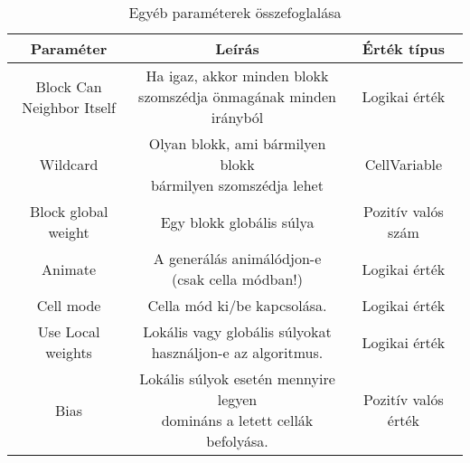 \begin{table}[htbp]
\caption{Egyéb paraméterek összefoglalása}
\begin{center}
\begin{tabular}{ |c|c|c| } 
\hline
Paraméter & Leírás & Érték típus \\
 \hline\hline
  \makecell{Block Can \\ Neighbor Itself} & \makecell{Ha igaz, akkor minden blokk 
 \\szomszédja önmagának minden irányból} & Logikai érték \\
 \hline
 Wildcard &\makecell{ Olyan blokk, ami bármilyen blokk \\ bármilyen szomszédja lehet} & CellVariable \\ 
 \hline
 Block global weight & Egy blokk globális súlya  & Pozitív valós szám\\ 
  \hline
  Animate & \makecell{A generálás animálódjon-e \\ (csak cella módban!)} & Logikai érték \\
 \hline
  Cell mode & Cella mód ki/be kapcsolása. & Logikai érték \\
 \hline
  Use Local weights & \makecell{Lokális vagy globális súlyokat \\ használjon-e az algoritmus.} & Logikai érték \\
 \hline
 Bias & \makecell{Lokális súlyok esetén mennyire legyen \\ domináns a letett cellák befolyása. \\ } & Pozitív valós érték \\
 \hline
\end{tabular}
\end{center}
\end{table}



